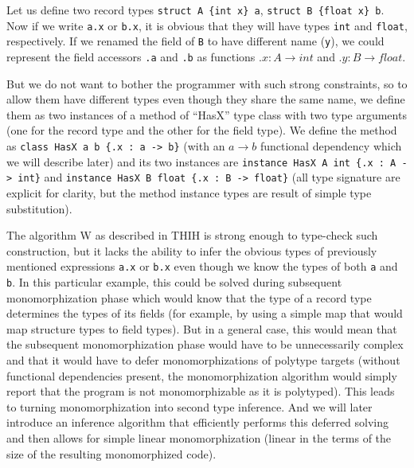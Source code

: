 Let us define two record types \lstinline|struct A {int x} a|, \lstinline|struct B {float x} b|. Now if we write \lstinline{a.x} or \lstinline{b.x}, it is obvious that they will have types \lstinline{int} and \lstinline{float}, respectively. If we renamed the field of \lstinline{B} to have different name (\lstinline{y}), we could represent the field accessors \lstinline{.a} and \lstinline{.b} as functions $.x : A \to int$ and $.y : B \to float$.

But we do not want to bother the programmer with such strong constraints, so to allow them have different types even though they share the same name, we define them as two instances of a method of ``HasX'' type class with two type arguments (one for the record type and the other for the field type). We define the method as \lstinline|class HasX a b {.x : a -> b}| (with an $a \to b$ functional dependency which we will describe later) and its two instances are \lstinline|instance HasX A int {.x : A -> int}| and \lstinline|instance HasX B float {.x : B -> float}| (all type signature are explicit for clarity, but the method instance types are result of simple type substitution).

The algorithm W as described in THIH is strong enough to type-check such construction, but it lacks the ability to infer the obvious types of previously mentioned expressions \lstinline{a.x} or \lstinline{b.x} even though we know the types of both \lstinline{a} and \lstinline{b}. In this particular example, this could be solved during subsequent monomorphization phase which would know that the type of a record type determines the types of its fields (for example, by using a simple map that would map structure types to field types). But in a general case, this would mean that the subsequent monomorphization phase would have to be unnecessarily complex and that it would have to defer monomorphizations of polytype targets (without functional dependencies present, the monomorphization algorithm would simply report that the program is not monomorphizable as it is polytyped). This leads to turning monomorphization into second type inference. And we will later introduce an inference algorithm that efficiently performs this deferred solving and then allows for simple linear monomorphization (linear in the terms of the size of the resulting monomorphized code).

